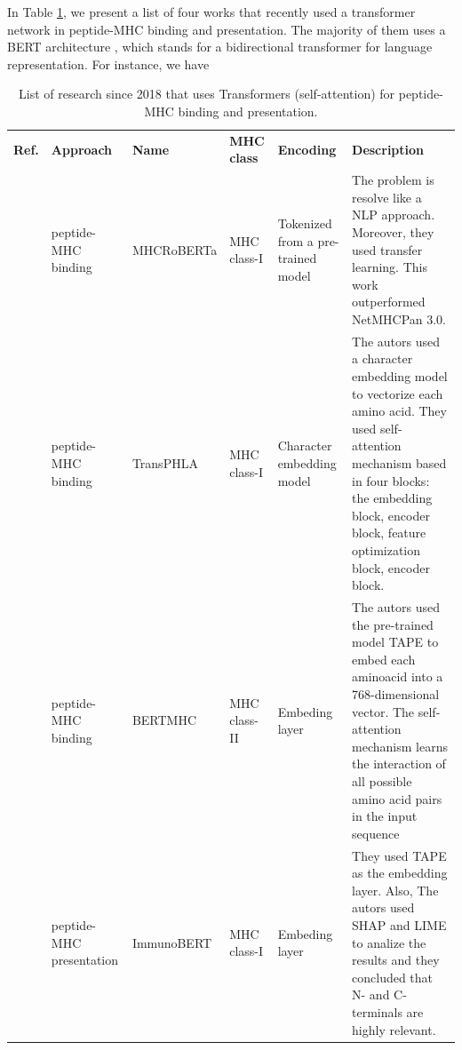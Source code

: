 In Table \ref{tab:transformes}, we present a list of four works that recently used a transformer network in peptide-MHC binding and presentation. The majority of them uses a BERT architecture \cite{devlin2018bert}, which stands for a bidirectional transformer for language representation. For instance, we have 

\begin{table}[]
	\caption{List of research since 2018 that uses Transformers (self-attention) for peptide-MHC binding and presentation.}
	\label{tab:transformes}
	\setlength{\tabcolsep}{0.5em} %
	{\renewcommand{\arraystretch}{1.2}%
		
		\begin{tabular}{p{1.3cm}p{1.6cm}p{2cm}p{1.6cm}p{1.9cm}p{4cm}}
			 \textbf{Ref.}                                  & \textbf{Approach}        & \textbf{Name} & \textbf{MHC class} & \textbf{Encoding}                  & \textbf{Description}                                                                                                                                                                                              \\
			           \cite{wang2022mhcroberta}     & peptide-MHC binding      & MHCRoBERTa    & MHC class-I        & Tokenized from a pre-trained model & The problem is resolve like a NLP approach. Moreover, they used transfer learning. This work outperformed NetMHCPan 3.0.                                                                                          \\
			           \cite{chu2022transformer}     & peptide-MHC binding      & TransPHLA     & MHC class-I        & Character embedding model          & The autors used a character embedding model to vectorize each amino acid. They used self-attention mechanism based in four blocks: the embedding block, encoder block, feature optimization block, encoder block. \\
			           \cite{cheng2021bertmhc}       & peptide-MHC binding      & BERTMHC       & MHC class-II       & Embeding layer                     & The autors used the pre-trained model TAPE to embed each aminoacid into a 768-dimensional vector. The self-attention mechanism learns the interaction of all possible amino acid pairs in the input sequence      \\
			           \cite{gasser2021interpreting} & peptide-MHC presentation & ImmunoBERT    & MHC class-I        & Embeding layer                     & They used TAPE as the embedding layer. Also, The autors used SHAP and LIME to analize the results and they concluded that N- and C-terminals are highly relevant.                                                
		\end{tabular}
	}
\end{table}



